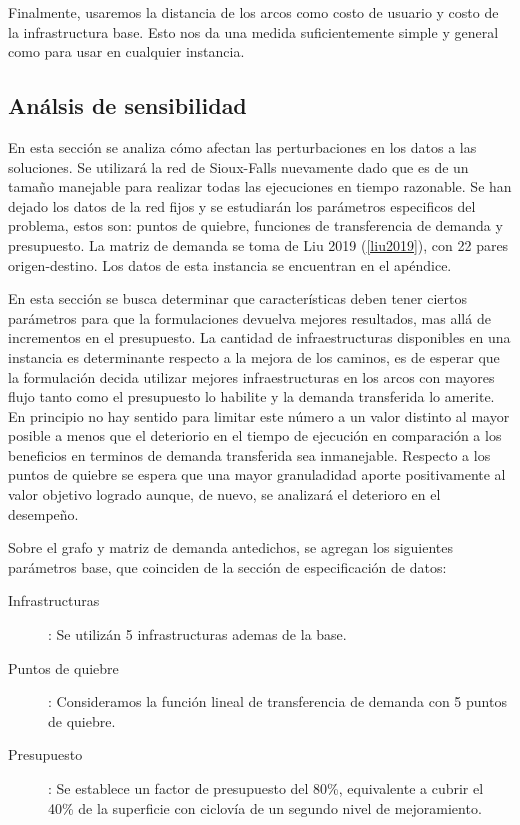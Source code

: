 \documentclass{article}
\begin{document}
  Finalmente, usaremos la distancia de los arcos como costo de usuario y costo de la infrastructura base. Esto nos da una medida suficientemente simple y general como para usar en cualquier instancia.

  \subsection*{Análsis de sensibilidad}

  En esta sección se analiza cómo afectan las perturbaciones en los datos a las soluciones. Se utilizará la red de Sioux-Falls nuevamente dado que es de un tamaño manejable para realizar todas las ejecuciones en tiempo razonable. Se han dejado los datos de la red fijos y se estudiarán los parámetros especificos del problema, estos son: puntos de quiebre, funciones de transferencia de demanda y presupuesto. La matriz de demanda se toma de Liu 2019 (\ref{liu2019}), con 22 pares origen-destino. Los datos de esta instancia se encuentran en el apéndice.

  En esta sección se busca determinar que características deben tener ciertos parámetros para que la formulaciones devuelva mejores resultados, mas allá de incrementos en el presupuesto. La cantidad de infraestructuras disponibles en una instancia es determinante respecto a la mejora de los caminos, es de esperar que la formulación decida utilizar mejores infraestructuras en los arcos con mayores flujo tanto como el presupuesto lo habilite y la demanda transferida lo amerite. En principio no hay sentido para limitar este número a un valor distinto al mayor posible a menos que el deteriorio en el tiempo de ejecución en comparación a los beneficios en terminos de demanda transferida sea inmanejable. Respecto a los puntos de quiebre se espera que una mayor granuladidad aporte positivamente al valor objetivo logrado aunque, de nuevo, se analizará el deterioro en el desempeño.

  Sobre el grafo y matriz de demanda antedichos, se agregan los siguientes parámetros base, que coinciden de la sección de especificación de datos:

  \begin{description}
    \item[Infrastructuras]: Se utilizán 5 infrastructuras ademas de la base.
    \item[Puntos de quiebre]: Consideramos la función lineal de transferencia de demanda con 5 puntos de quiebre.
    \item[Presupuesto]: Se establece un factor de presupuesto del 80\%, equivalente a cubrir el 40\% de la superficie con ciclovía de un segundo nivel de mejoramiento.
  \end{description}
\end{document}
